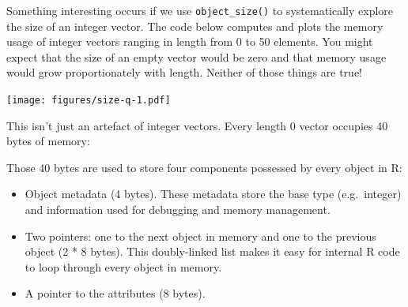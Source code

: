 Something interesting occurs if we use \texttt{object\_size()} to
systematically explore the size of an integer vector. The code below
computes and plots the memory usage of integer vectors ranging in length
from 0 to 50 elements. You might expect that the size of an empty vector
would be zero and that memory usage would grow proportionately with
length. Neither of those things are true! 

\begin{Shaded}
\begin{Highlighting}[]
\StringTok{ }\NormalTok{(}\NormalTok{:}\NormalTok{(}
\NormalTok{(}\NormalTok{:} \NormalTok{, } \NormalTok{, }
   \NormalTok{)}
\end{Highlighting}
\end{Shaded}

\texttt{[image: figures/size-q-1.pdf]}

This isn't just an artefact of integer vectors. Every length 0 vector
occupies 40 bytes of memory:

\begin{Shaded}
\begin{Highlighting}[]
\NormalTok{(}\NormalTok{())}
\NormalTok{(}\NormalTok{())}
\NormalTok{(}\NormalTok{())}
\NormalTok{(}\NormalTok{())}
\end{Highlighting}
\end{Shaded}

Those 40 bytes are used to store four components possessed by every
object in R:

\begin{itemize}
\item
  Object metadata (4 bytes). These metadata store the base type
  (e.g.~integer) and information used for debugging and memory
  management.
\item
  Two pointers: one to the next object in memory and one to the previous
  object (2 * 8 bytes). This doubly-linked list makes it easy for
  internal R code to loop through every object in memory.
\item
  A pointer to the attributes (8 bytes).
\end{itemize}

